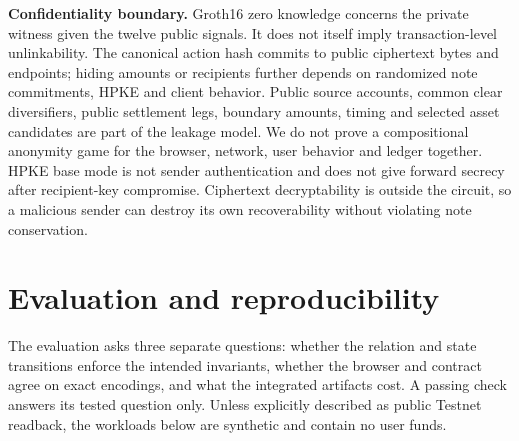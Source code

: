 \documentclass[11pt,letterpaper]{article}
\begin{document}
\textbf{Confidentiality boundary.} Groth16 zero knowledge concerns the
private witness given the twelve public signals. It does not itself
imply transaction-level unlinkability. The canonical action hash commits
to public ciphertext bytes and endpoints; hiding amounts or recipients
further depends on randomized note commitments, HPKE and client
behavior. Public source accounts, common clear diversifiers, public
settlement legs, boundary amounts, timing and selected asset candidates
are part of the leakage model. We do not prove a compositional anonymity
game for the browser, network, user behavior and ledger together. HPKE
base mode is not sender authentication and does not give forward secrecy
after recipient-key compromise. Ciphertext decryptability is outside the
circuit, so a malicious sender can destroy its own recoverability
without violating note conservation.

\section{Evaluation and
reproducibility}\label{evaluation-and-reproducibility}

The evaluation asks three separate questions: whether the relation and
state transitions enforce the intended invariants, whether the browser
and contract agree on exact encodings, and what the integrated artifacts
cost. A passing check answers its tested question only. Unless
explicitly described as public Testnet readback, the workloads below are
synthetic and contain no user funds.
\end{document}
